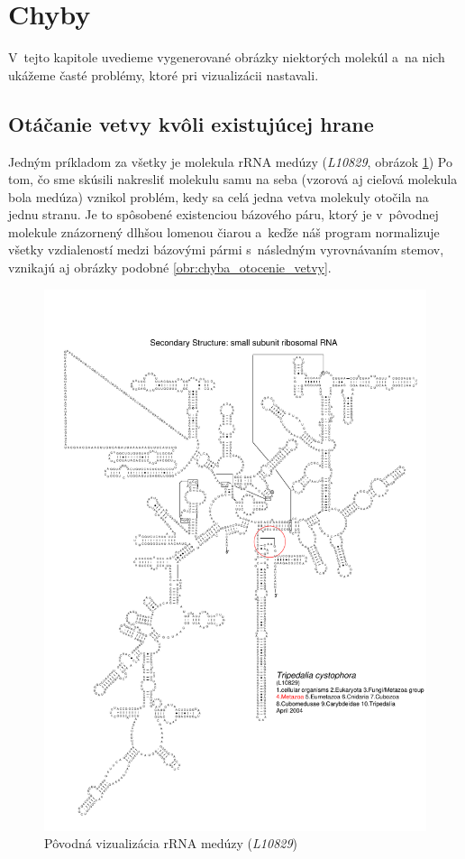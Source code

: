 \section{Chyby}

V~tejto kapitole uvedieme vygenerované obrázky niektorých molekúl a~na nich ukážeme časté problémy,
ktoré pri vizualizácii nastavali.

\subsection{Otáčanie vetvy kvôli existujúcej hrane}

Jedným príkladom za všetky je molekula rRNA medúzy (\textit{L10829},
obrázok \ref{obr:chyba_otocenie_vetvy_povodna})
Po tom, čo sme skúsili nakresliť molekulu samu na seba
(vzorová aj cieľová molekula bola medúza) vznikol problém,
kedy sa celá jedna vetva molekuly otočila na jednu stranu.
Je to spôsobené existenciou bázového páru,
ktorý je v~pôvodnej molekule znázornený dlhšou lomenou čiarou
a~keďže náš program normalizuje všetky vzdialeností medzi bázovými
pármi s~následným vyrovnávaním stemov, vznikajú aj obrázky
podobné \ref{obr:chyba_otocenie_vetvy}.

\begin{figure}
  \includegraphics[width=1\textwidth]{../img/chyby/tripedalia_cystophora}
  \caption{Pôvodná vizualizácia rRNA medúzy (\textit{L10829})}
  \label{obr:chyba_otocenie_vetvy_povodna}
\end{figure}

